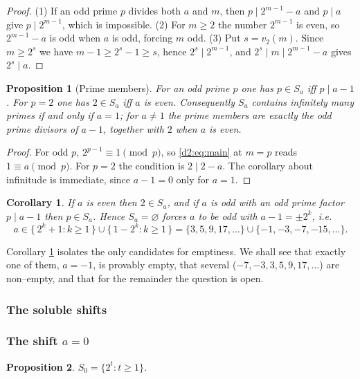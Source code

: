 \documentclass[a4paper]{article}
\theoremstyle{plain}
\newtheorem{proposition}{Proposition}[subsection]
\newtheorem{corollary}{Corollary}[subsection]
\theoremstyle{definition}
\theoremstyle{remark}
\newcommand{\dvd}{\mid}
\newcommand{\Sa}{S_a}
\begin{document}
\begin{proof}
(1) If an odd prime $p$ divides both $a$ and $m$, then $p\dvd 2^{m-1}-a$ and $p\dvd a$ give $p\dvd2^{m-1}$, which is impossible. (2) For $m\ge2$ the number $2^{m-1}$ is even, so $2^{m-1}-a$ is odd when $a$ is odd, forcing $m$ odd. (3) Put $s=v_2(m)$. Since $m\ge 2^{s}$ we have $m-1\ge 2^{s}-1\ge s$, hence $2^{s}\dvd2^{m-1}$, and $2^{s}\dvd m\dvd 2^{m-1}-a$ gives $2^{s}\dvd a$.
\end{proof}

\begin{proposition}[Prime members]\label{d2:prop:primes}
For an odd prime $p$ one has $p\in\Sa$ iff $p\dvd a-1$. For $p=2$ one has $2\in\Sa$ iff $a$ is even. Consequently $\Sa$ contains infinitely many primes if and only if $a=1$; for $a\ne1$ the prime members are exactly the odd prime divisors of $a-1$, together with $2$ when $a$ is even.
\end{proposition}

\begin{proof}
For odd $p$, $2^{p-1}\equiv1\pmod p$, so \eqref{d2:eq:main} at $m=p$ reads $1\equiv a\pmod p$. For $p=2$ the condition is $2\dvd 2-a$. The corollary about infinitude is immediate, since $a-1=0$ only for $a=1$.
\end{proof}

\begin{corollary}\label{d2:cor:nonempty}
If $a$ is even then $2\in\Sa$, and if $a$ is odd with an odd prime factor $p\dvd a-1$ then $p\in\Sa$. Hence $\Sa=\varnothing$ forces $a$ to be odd with $a-1=\pm2^{k}$, i.e.
\[
a\in\{\,2^{k}+1:k\ge1\,\}\cup\{\,1-2^{k}:k\ge1\,\}=\{3,5,9,17,\dots\}\cup\{-1,-3,-7,-15,\dots\}.
\]
\end{corollary}

Corollary \ref{d2:cor:nonempty} isolates the only candidates for emptiness. We shall see that exactly one of them, $a=-1$, is provably empty, that several ($-7,-3,3,5,9,17,\dots$) are non--empty, and that for the remainder the question is open.

\subsubsection{The soluble shifts}\label{d2:sec:soluble}

\subsubsection{The shift $a=0$}

\begin{proposition}\label{d2:prop:zero}
$S_0=\{2^{t}:t\ge1\}$.
\end{proposition}
\end{document}
